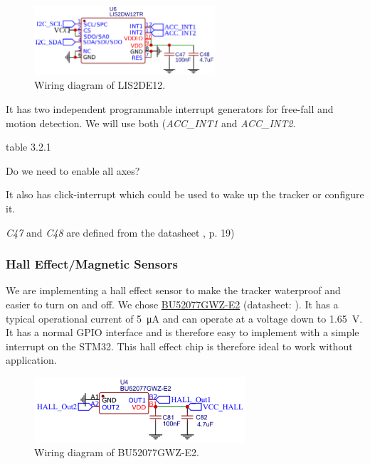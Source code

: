 \begin{figure}[H]
    \centering
    \includegraphics[width=0.6\textwidth]{figures/LIS2DE12.png}
    \caption{Wiring diagram of LIS2DE12.}
    \label{fig:schematic:lis2de12}
\end{figure}

It has two independent programmable interrupt generators for free-fall and motion detection. We will use both (\textit{ACC\_INT1} and \textit{ACC\_INT2}.


table 3.2.1 

Do we need to enable all axes?

It also has click-interrupt which could be used to wake up the tracker or configure it.

\textit{C47} and \textit{C48} are defined from the datasheet , p. 19)

\subsubsection{Hall Effect/Magnetic Sensors}
We are implementing a hall effect sensor to make the tracker waterproof and easier to turn on and off. We chose \hyperref[bom:bu52077gwz]{BU52077GWZ-E2} (datasheet: ). It has a typical operational current of \SI{5}{\micro\ampere} and can operate at a voltage down to \SI{1.65}{\volt}. It has a normal \ac{GPIO} interface and is therefore easy to implement with a simple interrupt on the STM32. This hall effect chip is therefore ideal to work without application.

\begin{figure}[H]
  \centering
  \includegraphics[width=0.7\textwidth]{figures/Hall.PNG}
  \caption{Wiring diagram of BU52077GWZ-E2.}
  \label{fig:schematic:BU52077GWZ}
\end{figure}

